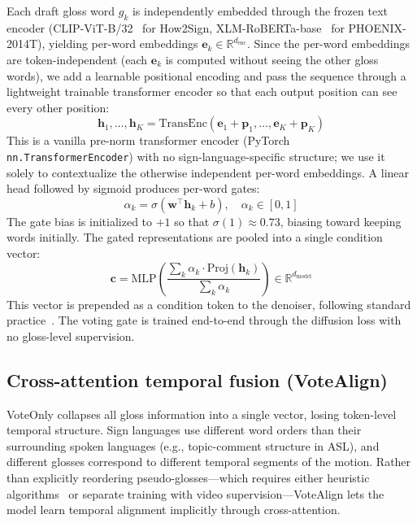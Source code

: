 \documentclass{article}
\begin{document}
Each draft gloss word $g_k$ is independently embedded through the frozen text encoder (CLIP-ViT-B/32~\citep{radford2021clip} for How2Sign, XLM-RoBERTa-base~\citep{conneau2020xlmr} for PHOENIX-2014T), yielding per-word embeddings $\mathbf{e}_k \in \mathbb{R}^{d_\text{enc}}$.
Since the per-word embeddings are token-independent (each $\mathbf{e}_k$ is computed without seeing the other gloss words), we add a learnable positional encoding and pass the sequence through a lightweight trainable transformer encoder so that each output position can see every other position:
\begin{equation}
    \mathbf{h}_1, \ldots, \mathbf{h}_K = \text{TransEnc}(\mathbf{e}_1 + \mathbf{p}_1, \ldots, \mathbf{e}_K + \mathbf{p}_K)
\end{equation}
This is a vanilla pre-norm transformer encoder (PyTorch \texttt{nn.TransformerEncoder}) with no sign-language-specific structure; we use it solely to contextualize the otherwise independent per-word embeddings.
A linear head followed by sigmoid produces per-word gates:
\begin{equation}
    \alpha_k = \sigma(\mathbf{w}^\top \mathbf{h}_k + b), \quad \alpha_k \in [0, 1]
\end{equation}
The gate bias is initialized to $+1$ so that $\sigma(1) \approx 0.73$, biasing toward keeping words initially.
The gated representations are pooled into a single condition vector:
\begin{equation}
    \mathbf{c} = \text{MLP}\!\left(\frac{\sum_k \alpha_k \cdot \text{Proj}(\mathbf{h}_k)}{\sum_k \alpha_k}\right) \in \mathbb{R}^{d_\text{model}}
\end{equation}
This vector is prepended as a condition token to the denoiser, following standard practice~\citep{tevet2023human}.
The voting gate is trained end-to-end through the diffusion loss with no gloss-level supervision.

\subsection{Cross-attention temporal fusion (VoteAlign)}
\label{sec:fusion}

VoteOnly collapses all gloss information into a single vector, losing token-level temporal structure.
Sign languages use different word orders than their surrounding spoken languages (e.g., topic-comment structure in ASL), and different glosses correspond to different temporal segments of the motion.
Rather than explicitly reordering pseudo-glosses---which requires either heuristic algorithms~\citep{wong2025pgg} or separate training with video supervision---VoteAlign lets the model learn temporal alignment implicitly through cross-attention.
\end{document}
